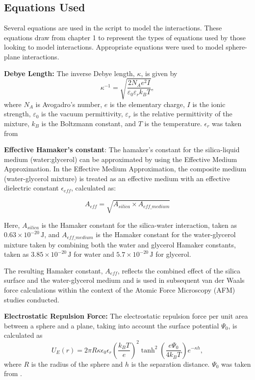 \subsection*{Equations Used}

Several equations are used in the script to model the interactions. These equations draw from chapter 1 to represent the types of equations used by those looking to model interactions. Appropriate equations were used to model sphere-plane interactions. 

\textbf{Debye Length:} The inverse Debye length, $\kappa$, is given by
    \[
    \kappa^{-1} = \sqrt{\frac{2 N_A e^2 I}{\varepsilon_0 \varepsilon_r k_B T}},
    \]
    where $N_A$ is Avogadro's number, $e$ is the elementary charge, $I$ is the ionic strength, $\varepsilon_0$ is the vacuum permittivity, $\varepsilon_r$ is the relative permittivity of the mixture, $k_B$ is the Boltzmann constant, and $T$ is the temperature. $\epsilon_r$ was taken from \cite{behrends2006dielectric}

\textbf{Effective Hamaker's constant}: The hamaker's constant for the silica-liquid medium (water:glycerol) can be approximated by using the Effective Medium Approximation. In the Effective Medium Approximation, the composite medium (water-glycerol mixture) is treated as an effective medium with an effective dielectric constant $\epsilon_{eff}$, calculated as:

\begin{equation}
    A_{eff} = \sqrt{A_{silica} \times A_{eff\_medium}}
\end{equation}

Here, $A_{silica}$ is the Hamaker constant for the silica-water interaction, taken as $0.63 \times 10^{-20} \, \text{J}$, \cite{Bergstrom1997} and $A_{eff\_medium}$ is the Hamaker constant for the water-glycerol mixture taken by combining both the water and glycerol Hamaker constants, taken as $3.85 \times 10^{-20} \, \text{J}$ for water and $5.7 \times 10^{-20} \, \text{J}$ for glycerol.

The resulting Hamaker constant, $A_{eff}$, reflects the combined effect of the silica surface and the water-glycerol medium and is used in subsequent van der Waals force calculations within the context of the Atomic Force Microscopy (AFM) studies conducted.
    
\textbf{Electrostatic Repulsion Force:} The electrostatic repulsion force per unit area between a sphere and a plane, taking into account the surface potential $\Psi_0$, is calculated as
    \[
    U_E(r) = 2 \pi R \kappa \epsilon_0 \epsilon_r \left( \frac{k_B T}{e} \right)^2 \tanh^2\left(\frac{e \Psi_0}{4 k_B T}\right) e^{-\kappa h},
    \]
    where $R$ is the radius of the sphere and $h$ is the separation distance. $\Psi_0$ was taken from \cite{silica2021}.
    
